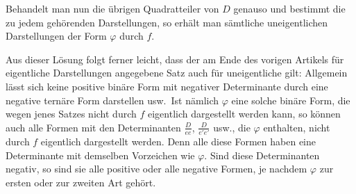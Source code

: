 Behandelt man nun die übrigen Quadratteiler von $D$ genauso und
bestimmt die zu jedem gehörenden Darstellungen, so erhält man sämtliche
uneigentlichen Darstellungen der Form $\varphi$ durch $f$.

Aus dieser Lösung folgt ferner leicht, dass der am Ende des vorigen
Artikels für eigentliche Darstellungen angegebene Satz auch für uneigentliche
gilt: Allgemein lässt sich keine positive binäre Form mit negativer
Determinante durch eine negative ternäre Form darstellen usw.\ Ist
nämlich $\varphi$ eine solche binäre Form, die wegen jenes Satzes nicht
durch $f$ eigentlich dargestellt werden kann, so können auch alle
Formen mit den Determinanten $\frac{D}{ee}$, $\frac{D}{e'e'}$ usw., die $\varphi$ enthalten,
nicht durch $f$ eigentlich dargestellt werden. Denn alle diese Formen
haben eine Determinante mit demselben Vorzeichen wie $\varphi$. Sind
diese Determinanten negativ, so sind sie alle positive oder alle negative
Formen, je nachdem $\varphi$ zur ersten oder zur zweiten Art gehört.

